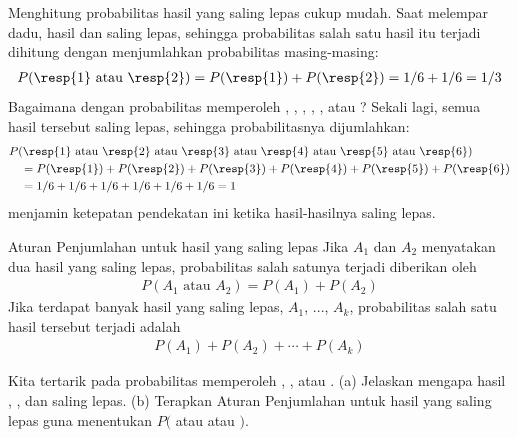 Menghitung probabilitas hasil yang saling lepas cukup mudah. Saat melempar dadu, hasil  dan  saling lepas, sehingga probabilitas salah satu hasil itu terjadi dihitung dengan menjumlahkan probabilitas masing-masing:
\begin{align*}
P(\text{\resp{1} atau \resp{2}})
  = P(\text{\resp{1}})+P(\text{\resp{2}})
  = 1/6 + 1/6
  = 1/3
\end{align*}
Bagaimana dengan probabilitas memperoleh , , , , , atau ? Sekali lagi, semua hasil tersebut saling lepas, sehingga probabilitasnya dijumlahkan:
\begin{align*}
&P(\text{\resp{1} atau \resp{2} atau \resp{3} atau \resp{4}
    atau \resp{5} atau \resp{6}}) \\
  &\quad = P(\text{\resp{1}})+P(\text{\resp{2}})
      + P(\text{\resp{3}})+P(\text{\resp{4}})
      + P(\text{\resp{5}})+P(\text{\resp{6}}) \\
  &\quad = 1/6 + 1/6 + 1/6 + 1/6 + 1/6 + 1/6
  = 1
\end{align*}
 menjamin ketepatan pendekatan ini ketika hasil-hasilnya saling lepas.

\begin{onebox}{Aturan Penjumlahan untuk hasil yang saling lepas}
  Jika $A_1$ dan $A_2$ menyatakan dua hasil yang saling lepas,
  probabilitas salah satunya terjadi diberikan oleh
  \begin{align*}
  P(A_1\text{ atau } A_2) = P(A_1) + P(A_2)
  \end{align*}
  Jika terdapat banyak hasil yang saling lepas, $A_1$, ..., $A_k$,
  probabilitas salah satu hasil tersebut terjadi adalah
  \begin{align*}
  P(A_1) + P(A_2) + \cdots + P(A_k)
  \end{align*}
\end{onebox}

\D{\newpage}

\begin{exercisewrap}
\begin{nexercise}
Kita tertarik pada probabilitas memperoleh , , atau . (a) Jelaskan mengapa hasil , , dan  saling lepas. (b) Terapkan Aturan Penjumlahan untuk hasil yang saling lepas guna menentukan $P($ atau  atau $)$.\footnotemark
\end{nexercise}
\end{exercisewrap}

